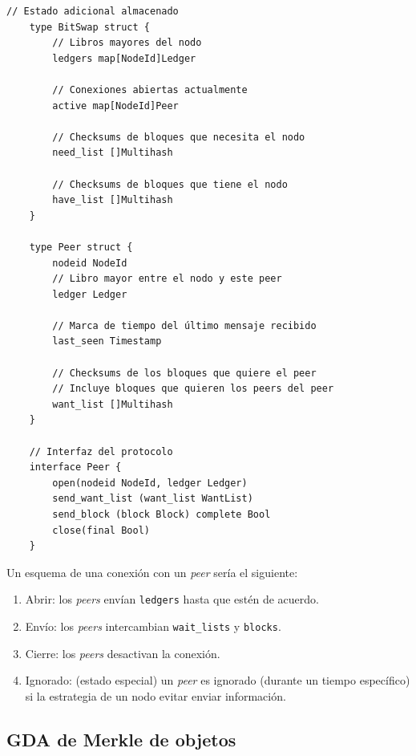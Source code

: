 \documentclass[12pt]{article} %
\begin{document}
\begin{lstlisting}[caption={Implementación del protocolo BitSwap}, language=Golang]
	// Estado adicional almacenado
	type BitSwap struct {
		// Libros mayores del nodo
		ledgers map[NodeId]Ledger

		// Conexiones abiertas actualmente
		active map[NodeId]Peer

		// Checksums de bloques que necesita el nodo
		need_list []Multihash

		// Checksums de bloques que tiene el nodo
		have_list []Multihash
	}

	type Peer struct {
		nodeid NodeId
		// Libro mayor entre el nodo y este peer
		ledger Ledger

		// Marca de tiempo del último mensaje recibido
		last_seen Timestamp

		// Checksums de los bloques que quiere el peer
		// Incluye bloques que quieren los peers del peer
		want_list []Multihash
	}

	// Interfaz del protocolo
	interface Peer {
		open(nodeid NodeId, ledger Ledger)
		send_want_list (want_list WantList)
		send_block (block Block) complete Bool
		close(final Bool)
	}
\end{lstlisting}

Un esquema de una conexión con un \textit{peer} sería el siguiente:
\begin{enumerate}
	\item Abrir: los \textit{peers} envían \texttt{ledgers} hasta que estén de acuerdo.
	\item Envío: los \textit{peers} intercambian \texttt{wait\_lists} y \texttt{blocks}.
	\item Cierre: los \textit{peers} desactivan la conexión.
	\item Ignorado: (estado especial) un \textit{peer} es ignorado (durante un tiempo específico) si la estrategia de un nodo evitar enviar información.
\end{enumerate}




\subsection{GDA de Merkle de objetos} %
\label{sub:grafo_dirigido_acíclico_de_merkle_de_objetos}
\end{document}

